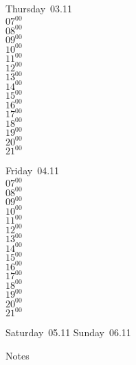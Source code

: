\documentclass[11pt,a4paper]{book}\usepackage[]{graphicx}\usepackage[]{color}
\begin{document}
\clearpage
\begin{headerbox}
\end{headerbox}
\begin{weekdaybox}
  Thursday~03.11\\
  { 
  \vfill
  $07^{00}$\\
$08^{00}$\\
$09^{00}$\\
$10^{00}$\\
$11^{00}$\\
$12^{00}$\\
$13^{00}$\\
$14^{00}$\\
$15^{00}$\\
$16^{00}$\\
$17^{00}$\\
$18^{00}$\\
$19^{00}$\\
$20^{00}$\\
$21^{00}$\\
  }
\end{weekdaybox} 
\begin{weekdaybox}
  Friday~04.11\\
  { 
  \vfill
  $07^{00}$\\
$08^{00}$\\
$09^{00}$\\
$10^{00}$\\
$11^{00}$\\
$12^{00}$\\
$13^{00}$\\
$14^{00}$\\
$15^{00}$\\
$16^{00}$\\
$17^{00}$\\
$18^{00}$\\
$19^{00}$\\
$20^{00}$\\
$21^{00}$\\
  }
\end{weekdaybox}
\begin{weekendbox}
  Saturday~05.11
  \tcblower
  Sunday~06.11
\end{weekendbox} %
\begin{notebox}
  Notes
\end{notebox}
\clearpage
\end{document}
